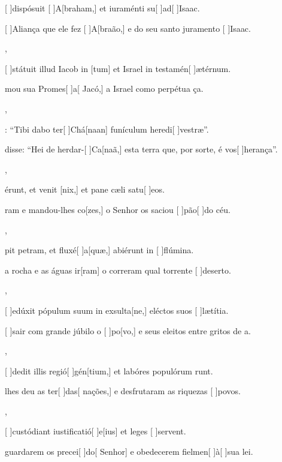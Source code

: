 {  {\item {}[ ]{dis}pósuit [ ]{A}[braham,] et iuraménti su[ ]{ad}[ ]{I}saac.~\Antiphona}%
    {\item {}[ ]{A}liança que ele fez [ ]{A}[braão,] e do seu santo juramento [ ]{I}{sa}ac.~\Antiphona},
  {\item {}[ ]{stá}tuit illud Iacob in [tum] et Israel in testamén[ ]{æ}{tér}num.~\Antiphona}%
    {\item {}mou sua Promes[ ]{a}[ Jacó,] a Israel como perpétua ça.~\Antiphona},
  {\item {}: “Tibi dabo ter[ ]{Chá}[naan] funículum heredi[ ]{ve}stræ”.~\Antiphona}%
    {\item {} disse: “Hei de herdar-[ ]{Ca}[naã,] esta terra que, por sorte, é vos[ ]{he}{ran}ça”.~\Antiphona},
  {\item {}érunt, et venit [nix,] et pane cæli satu[ ]{e}os.~\Antiphona}%
    {\item {}ram e mandou-lhes co[zes,] o Senhor os saciou [ ]{pão}[ ]{do} céu.~\Antiphona},
  {\item {}pit petram, et fluxé[ ]{a}[quæ,] abiérunt in [ ]{flú}mina.~\Antiphona}%
    {\item {} a rocha e as águas ir[ram] o correram qual torrente [ ]{de}{ser}to.~\Antiphona},
  {\item {}[ ]{e}dúxit pópulum suum in exsulta[ne,] eléctos suos [ ]{læ}{tí}tia.~\Antiphona}%
    {\item {}[ ]{sa}ir com grande júbilo o [ ]{po}[vo,] e seus eleitos entre gritos de a.~\Antiphona},
  {\item {}[ ]{de}dit illis regió[ ]{gén}[tium,] et labóres populórum runt.~\Antiphona}%
    {\item {} lhes deu as ter[ ]{das}[ nações,] e desfrutaram as riquezas [ ]{po}vos.~\Antiphona},
  {\item {}[ ]{cu}stódiant iustificatió[ ]{e}[ius] et leges [ ]{ser}\-vent.~\Antiphona}%
    {\item {} guardarem os precei[ ]{do}[ Senhor] e obedecerem fielmen[ ]{à}[ ]{su}a lei.~\Antiphona}
}